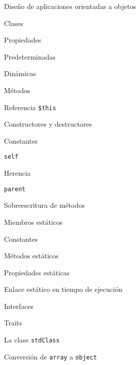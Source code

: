 \begin{longenum}
    \begin{longenum}
        \item Diseño de aplicaciones orientadas a objetos
        \begin{longenum}
            \item Clases
            \item Propiedades
            \begin{longenum}
                \item Predeterminadas
                \item Dinámicas
            \end{longenum}
            \item Métodos
            \begin{longenum}
                \item Referencia \texttt{\$this}
                \item Constructores y destructores
            \end{longenum}
            \item Constantes
            \begin{longenum}
                \item \texttt{self}
            \end{longenum}
            \item Herencia
            \begin{longenum}
                \item \texttt{parent}
                \item Sobreescritura de métodos
            \end{longenum}
            \item Miembros estáticos
            \begin{longenum}
                \item Constantes
                \item Métodos estáticos
                \item Propiedades estáticas
                \item Enlace estático en tiempo de ejecución
            \end{longenum}
            \item Interfaces
            \item Traits
            \item La clase \texttt{stdClass}
            \begin{longenum}
                \item Conversión de \texttt{array} a \texttt{object}

\end{longenum}
\end{longenum}
\end{longenum}
\end{longenum}
